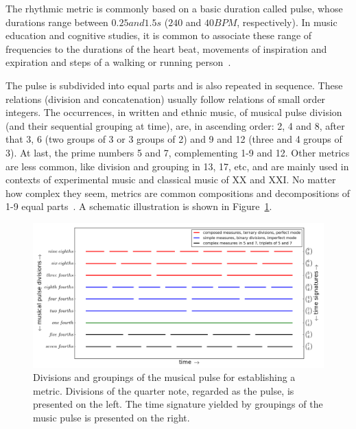 The rhythmic metric is commonly based on a basic duration called pulse, whose durations range between $0.25 and 1.5s$ ($240$
and $40 BPM$, respectively). In music education and cognitive studies, it is common to associate these range of frequencies to the durations of the heart beat, movements of inspiration and expiration and steps of a walking or running person~\cite{Lacerda,Roederer}.

The pulse is subdivided into equal parts and is also repeated in sequence. These relations (division and concatenation) usually follow relations of small
order integers. The occurrences, in written and ethnic
music, of musical pulse division (and their sequential grouping at
time), are, in ascending order: 2, 4 and 8, after that 3, 6 (two groups of 3 or 3 groups of 2) and 9 and 12 (three and 4 groups of 3). At last, the prime numbers 5 and 7, complementing
1-9 and 12. Other metrics are less common, like division and grouping in 13, 17, etc, and are mainly used in contexts of experimental music and classical music of XX and XXI. No matter how complex they seem, metrics are common compositions and decompositions of 1-9 equal parts~\cite{Gramani,Roederer}.
A schematic illustration is shown in Figure~\ref{fig:pulsoSubAgl}.

\begin{figure}
    \centering
        \includegraphics[width=.9\textwidth]{figures/metricaMusical_}
    \caption{Divisions and groupings of the musical pulse for establishing a metric. Divisions of the quarter note, regarded as the
        pulse, is presented on the left. The time signature yielded by
        groupings of the music pulse is presented on the right.}
        \label{fig:pulsoSubAgl}
\end{figure}

